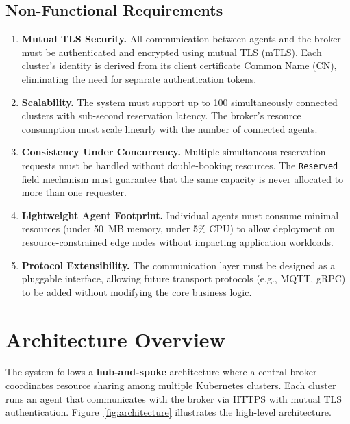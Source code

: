 \subsection{Non-Functional Requirements}
\label{subsec:nonfunctional-req}

\begin{enumerate}[label=\textbf{NFR\arabic*}]
    \item \textbf{Mutual TLS Security.}
    All communication between agents and the broker must be authenticated and encrypted using mutual TLS (mTLS). Each cluster's identity is derived from its client certificate Common Name (CN), eliminating the need for separate authentication tokens.

    \item \textbf{Scalability.}
    The system must support up to 100 simultaneously connected clusters with sub-second reservation latency. The broker's resource consumption must scale linearly with the number of connected agents.

    \item \textbf{Consistency Under Concurrency.}
    Multiple simultaneous reservation requests must be handled without double-booking resources. The \texttt{Reserved} field mechanism must guarantee that the same capacity is never allocated to more than one requester.

    \item \textbf{Lightweight Agent Footprint.}
    Individual agents must consume minimal resources (under 50~MB memory, under 5\% CPU) to allow deployment on resource-constrained edge nodes without impacting application workloads.

    \item \textbf{Protocol Extensibility.}
    The communication layer must be designed as a pluggable interface, allowing future transport protocols (e.g., MQTT, gRPC) to be added without modifying the core business logic.
\end{enumerate}


\section{Architecture Overview}
\label{sec:architecture}

The system follows a \textbf{hub-and-spoke} architecture where a central broker coordinates resource sharing among multiple Kubernetes clusters. Each cluster runs an agent that communicates with the broker via HTTPS with mutual TLS authentication. Figure~\ref{fig:architecture} illustrates the high-level architecture.

